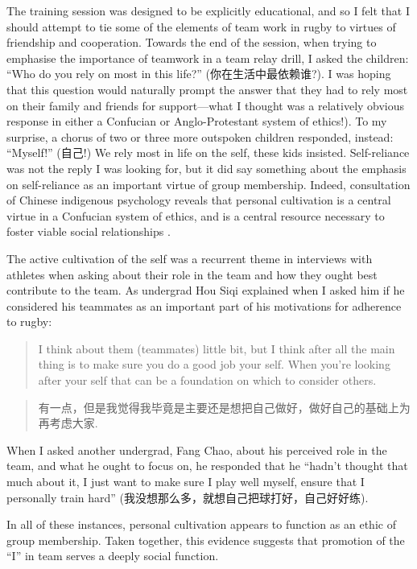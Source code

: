 \begin{CJK}{UTF8}{gbsn}
The training session was designed to be explicitly educational, and so I felt that I should attempt to tie some of the elements of team work in rugby to virtues of friendship and cooperation.  Towards the end of the session, when trying to emphasise the importance of teamwork in a team relay drill, I asked the children: ``Who do you rely on most in this life?'' (你在生活中最依赖谁?).  I was hoping that this question would naturally prompt the answer that they had to rely most on their family and friends for support---what I thought was a relatively obvious response in either a Confucian or Anglo-Protestant system of ethics!).  To my surprise, a chorus of two or three more outspoken children responded, instead: ``Myself!'' (自己!) We rely most in life on the self, these kids insisted. Self-reliance was not the reply I was looking for, but it did say something about the emphasis on self-reliance as an important virtue of group membership.  Indeed, consultation of Chinese indigenous psychology reveals that personal cultivation is a central virtue in a Confucian system of ethics, and is a central resource necessary to foster viable social relationships \citep{Liu2014}.

The active cultivation of the self was a recurrent theme in interviews with athletes when asking about their role in the team and how they ought best contribute to the team.  As undergrad Hou Siqi explained when I asked him if he considered his teammates as an important part of his motivations for adherence to rugby:
   \begin{quote}
       I think about them (teammates) little bit, but I think after all the main thing is to make sure you do a good job your self.  When you're looking after your self that can be a foundation on which to consider others.
   \end{quote}
   \begin{quote}
         有一点，但是我觉得我毕竟是主要还是想把自己做好，做好自己的基础上为再考虑大家.
   \end{quote}

When I asked another undergrad, Fang Chao, about his perceived role in the team, and what he ought to focus on, he responded that he ``hadn't thought that much about it, I just want to make sure I play well myself, ensure that I personally train hard'' (我没想那么多，就想自己把球打好，自己好好练).

In all of these instances, personal cultivation appears to function as an ethic of group membership.  Taken together, this evidence suggests that promotion of the ``I'' in team serves a deeply social function.


\end{CJK}
